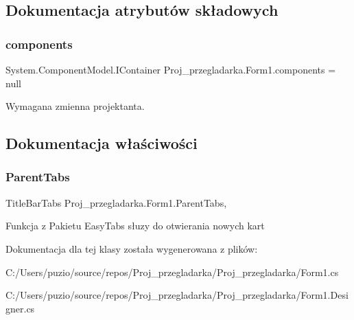 \subsection{Dokumentacja atrybutów składowych}
\mbox{\label{class_proj__przegladarka_1_1_form1_a128c716069ac292cffd0450adb33f207}} 
\subsubsection{\texorpdfstring{components}{components}}
{\footnotesize\ttfamily System.\+Component\+Model.\+I\+Container Proj\+\_\+przegladarka.\+Form1.\+components = null\hspace{0.3cm}{\ttfamily [private]}}



Wymagana zmienna projektanta. 



\subsection{Dokumentacja właściwości}
\mbox{\label{class_proj__przegladarka_1_1_form1_af95b96451eb281101ff02dca5edd6ef3}} 
\subsubsection{\texorpdfstring{ParentTabs}{ParentTabs}}
{\footnotesize\ttfamily Title\+Bar\+Tabs Proj\+\_\+przegladarka.\+Form1.\+Parent\+Tabs\hspace{0.3cm}{\ttfamily [get]}, {\ttfamily [protected]}}



Funkcja z Pakietu Easy\+Tabs słuzy do otwierania nowych kart 



Dokumentacja dla tej klasy została wygenerowana z plików\+:\begin{DoxyCompactItemize}
\item 
C\+:/\+Users/puzio/source/repos/\+Proj\+\_\+przegladarka/\+Proj\+\_\+przegladarka/Form1.\+cs\item 
C\+:/\+Users/puzio/source/repos/\+Proj\+\_\+przegladarka/\+Proj\+\_\+przegladarka/Form1.\+Designer.\+cs\end{DoxyCompactItemize}
